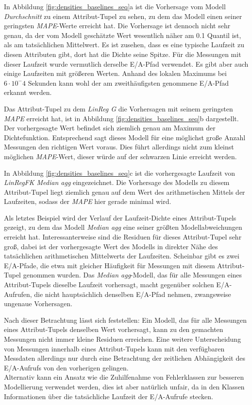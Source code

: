 \documentclass[
	12pt,
	a4paper,
	BCOR10mm,
	DIV14,
	listof=totoc,
	bibliography=totoc,
	headsepline
]{scrreprt}
\begin{document}
In Abbildung \ref{fig:densities_baselines_seq}a ist die Vorhersage vom Modell \textit{Durchschnitt} zu einem Attribut-Tupel zu sehen, zu dem das Modell einen seiner geringsten \textit{MAPE}-Werte erreicht hat.
Die Vorhersage ist dennoch nicht sehr genau, da der vom Modell geschätzte Wert wesentlich näher am 0.1 Quantil ist, als am tatsächlichen Mittelwert.
Es ist zusehen, dass es eine typische Laufzeit zu diesen Attributen gibt, dort hat die Dichte seine Spitze. Für die Messungen mit dieser Laufzeit wurde vermutlich derselbe E/A-Pfad verwendet. Es gibt aber auch einige Laufzeiten mit größeren Werten.
Anhand des lokalen Maximums bei $6\cdot 10^-4$ Sekunden kann wohl der am zweithäufigsten genommene E/A-Pfad erkannt werden.\medskip

Das Attribut-Tupel zu dem \textit{LinReg G} die Vorhersagen mit seinem geringsten \textit{MAPE} erreicht hat, ist in Abbildung \ref{fig:densities_baselines_seq}b dargestellt.
Der vorhergesagte Wert befindet sich ziemlich genau am Maximum der Dichtefunktion. Entsprechend sagt dieses Modell für eine möglichst große Anzahl Messungen den richtigen Wert voraus. Dies führt allerdings nicht zum kleinst möglichen \textit{MAPE}-Wert, dieser würde auf der schwarzen Linie erreicht werden.\medskip
 
In Abbildung \ref{fig:densities_baselines_seq}c ist die vorhergesagte Laufzeit von \textit{LinRegFK Median agg} eingezeichnet.
Die Vorhersage des Modells zu diesem Attribut-Tupel liegt ziemlich genau auf dem Wert des arithmetischen Mittels der Laufzeiten, sodass der \textit{MAPE} hier gerade minimal wird.\medskip

Als letztes Beispiel wird der Verlauf der Laufzeit-Dichte eines Attribut-Tupels gezeigt, zu dem das Modell \textit{Median agg} eine seiner größten Modellabweichungen erreicht hat.
Interessanterweise sind die Residuen für dieses Attribut-Tupel sehr groß, dabei ist der vorhergesagte Wert des Modells in direkter Nähe des tatsächlichen arithmetischen Mittelwerts der Laufzeiten.
Scheinbar gibt es zwei E/A-Pfade, die etwa mit gleicher Häufigkeit für Messungen mit diesem Attribut-Tupel genommen wurden. 
Das \textit{Median agg}-Modell, das für alle Messungen eines Attribut-Tupels dieselbe Laufzeit vorhersagt, macht gegenüber solchen E/A-Aufrufen, die nicht hauptsächlich denselben E/A-Pfad nehmen, zwangsweise ungenaue Vorhersagen. \medskip

Nach dieser Betrachtung lässt sich feststellen:
Ein Modell, das für alle Messungen eines Attribut-Tupels denselben Wert vorhersagt, kann zu den gemachten Messungen nicht immer kleine Residuen erreichen.
Eine weitere Unterscheidung von Messungen innerhalb eines Attribut-Tupels kann mit den verfügbaren Messdaten allerdings nur durch eine Betrachtung der zeitlichen Abhängigkeit des E/A-Aufrufs von den vorherigen gelingen.\\
Alternativ kann ein Ansatz wie die Zuhilfenahme von Fehlerklassen zur besseren Modellierung verwendet werden, dies ist aber natürlich \glqq unfair\grqq{}, da in den Klassen Informationen über die tatsächliche Laufzeit der E/A-Aufrufe stecken.
 
\end{document}
